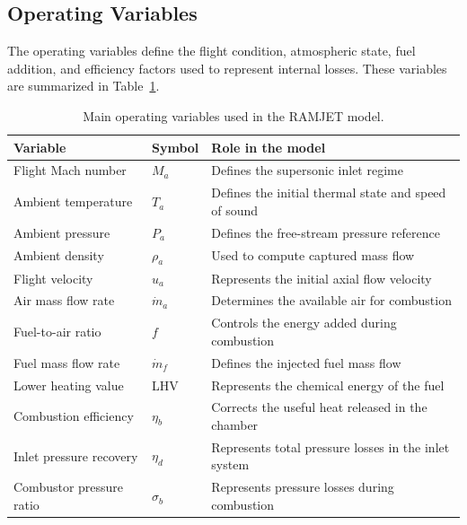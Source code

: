 \documentclass[preprint,12pt]{elsarticle}
\begin{document}
\subsection{Operating Variables}
The operating variables define the flight condition, atmospheric state, fuel addition, and efficiency factors used to represent internal losses. These variables are summarized in Table~\ref{tab:ramjet_operating_variables}.
\begin{table}[H]
\centering
\caption{Main operating variables used in the RAMJET model.}
\label{tab:ramjet_operating_variables}
\begin{tabularx}{\textwidth}{lll}
\toprule
\textbf{Variable} & \textbf{Symbol} & \textbf{Role in the model} \\
\midrule
Flight Mach number & $M_a$ & Defines the supersonic inlet regime \\
Ambient temperature & $T_a$ & Defines the initial thermal state and speed of sound \\
Ambient pressure & $P_a$ & Defines the free-stream pressure reference \\
Ambient density & $\rho_a$ & Used to compute captured mass flow \\
Flight velocity & $u_a$ & Represents the initial axial flow velocity \\
Air mass flow rate & $\dot{m}_a$ & Determines the available air for combustion \\
Fuel-to-air ratio & $f$ & Controls the energy added during combustion \\
Fuel mass flow rate & $\dot{m}_f$ & Defines the injected fuel mass flow \\
Lower heating value & LHV & Represents the chemical energy of the fuel \\
Combustion efficiency & $\eta_b$ & Corrects the useful heat released in the chamber \\
Inlet pressure recovery & $\eta_d$ & Represents total pressure losses in the inlet system \\
Combustor pressure ratio & $\sigma_b$ & Represents pressure losses during combustion \\
\bottomrule
\end{tabularx}
\end{table}
\end{document}
